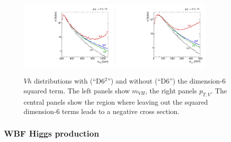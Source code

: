 \begin{figure}[t]
  \includegraphics[width=0.43\textwidth]{fig/validity/VH_T4_mVH}
  \hspace*{0.05\textwidth}
  \includegraphics[width=0.43\textwidth]{fig/validity/VH_T4_Vpt}
  \caption{$Vh$ distributions with (``D6$^{2}$'') and without (``D6'')
    the dimension-6 squared
    term. The left panels show $m_{VH}$, the right panels
    $p_{T,V}$. The central panels show the region where leaving out
    the squared dimension-6 terms leads to a negative cross section.}
  \label{fig:validity_squared_VH}
\end{figure}


\subsubsection*{WBF Higgs production}

